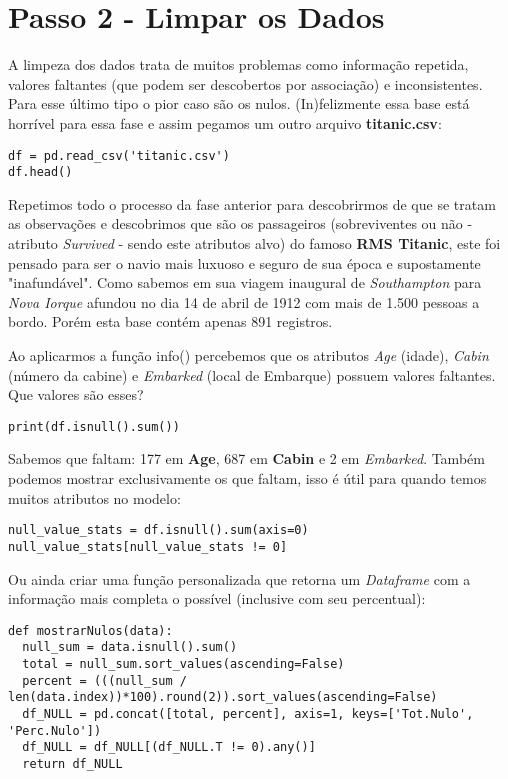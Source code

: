 \section{Passo 2 - Limpar os Dados}
A limpeza dos dados trata de muitos problemas como informação repetida, valores faltantes (que podem ser descobertos por associação) e inconsistentes. Para esse último tipo o pior caso são os nulos. (In)felizmente essa base está horrível para essa fase e assim pegamos um outro arquivo \textbf{titanic.csv}: 
\begin{lstlisting}[]
df = pd.read_csv('titanic.csv')
df.head()
\end{lstlisting}

Repetimos todo o processo da fase anterior para descobrirmos de que se tratam as observações e descobrimos que são os passageiros (sobreviventes ou não - atributo \textit{Survived} - sendo este atributos alvo) do famoso \textbf{RMS Titanic}, este foi pensado para ser o navio mais luxuoso e seguro de sua época e supostamente "inafundável". Como sabemos em sua viagem inaugural de \textit{Southampton} para \textit{Nova Iorque} afundou no dia 14 de abril de 1912 com mais de 1.500 pessoas a bordo. Porém esta base contém apenas 891 registros.

Ao aplicarmos a função info() percebemos que os atributos \textit{Age} (idade), \textit{Cabin} (número da cabine) e \textit{Embarked} (local de Embarque) possuem valores faltantes. Que valores são esses?
\begin{lstlisting}[]
print(df.isnull().sum())
\end{lstlisting}

Sabemos que faltam: 177 em \textbf{Age}, 687 em \textbf{Cabin} e 2 em \textit{Embarked}. Também podemos mostrar exclusivamente os que faltam, isso é útil para quando temos muitos atributos no modelo:
\begin{lstlisting}[]
null_value_stats = df.isnull().sum(axis=0)
null_value_stats[null_value_stats != 0]
\end{lstlisting}

Ou ainda criar uma função personalizada que retorna um \textit{Dataframe} com a informação mais completa o possível (inclusive com seu percentual):
\begin{lstlisting}[]
def mostrarNulos(data):
  null_sum = data.isnull().sum()
  total = null_sum.sort_values(ascending=False)
  percent = (((null_sum / len(data.index))*100).round(2)).sort_values(ascending=False)
  df_NULL = pd.concat([total, percent], axis=1, keys=['Tot.Nulo', 'Perc.Nulo'])
  df_NULL = df_NULL[(df_NULL.T != 0).any()]
  return df_NULL
\end{lstlisting}

